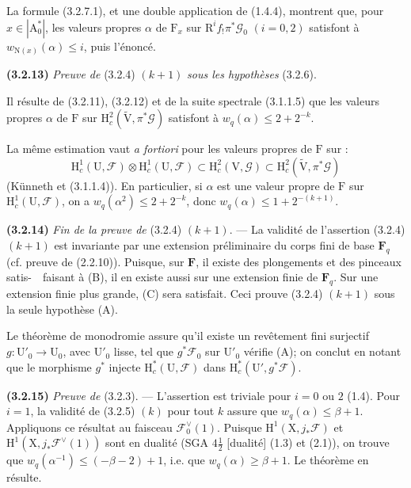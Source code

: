 \documentclass[11pt,leqno]{article}
\newcommand{\Page}[1]{\ifvmode\noindent\else\unskip\ \fi{\footnotesize\textcolor{gray}{[p.\,#1]}}\ \ignorespaces}
\begin{document}
La formule (3.2.7.1), et une double application de (1.4.4), montrent que, pour \(x\in|\mathrm{A}_0^*|\), les valeurs propres \(\alpha\) de \(\mathrm{F}_x\) sur \(\mathrm{R}^if_!\pi^*\mathscr{G}_0\) \((i=0,2)\) satisfont à \(w_{\mathrm{N}(x)}(\alpha)\leq i\), puis l’énoncé.

\textbf{(3.2.13)} \textit{Preuve de} (3.2.4) \((k+1)\) \textit{sous les hypothèses} (3.2.6).

Il résulte de (3.2.11), (3.2.12) et de la suite spectrale (3.1.1.5) que les valeurs propres \(\alpha\) de \(\mathrm{F}\) sur \(\mathrm{H}_c^2(\widetilde{\mathrm{V}},\pi^*\mathscr{G})\) satisfont à \(w_q(\alpha)\leq2+2^{-k}\).

La même estimation vaut \textit{a fortiori} pour les valeurs propres de \(\mathrm{F}\) sur :
\[
\mathrm{H}_c^1(\mathrm{U},\mathscr{F})\otimes
\mathrm{H}_c^1(\mathrm{U},\mathscr{F})
\subset\mathrm{H}_c^2(\mathrm{V},\mathscr{G})
\subset\mathrm{H}_c^2(\widetilde{\mathrm{V}},\pi^*\mathscr{G})
\]
(Künneth et (3.1.1.4)). En particulier, si \(\alpha\) est une valeur propre de \(\mathrm{F}\) sur \(\mathrm{H}_c^1(\mathrm{U},\mathscr{F})\), on a \(w_q(\alpha^2)\leq2+2^{-k}\), donc \(w_q(\alpha)\leq1+2^{-(k+1)}\).

\textbf{(3.2.14)} \textit{Fin de la preuve de} (3.2.4) \((k+1)\). — La validité de l’assertion (3.2.4) \((k+1)\) est invariante par une extension préliminaire du corps fini de base \(\mathbf{F}_q\) (cf. preuve de (2.2.10)). Puisque, sur \(\mathbf{F}\), il existe des plongements et des pinceaux satis-\Page{204}faisant à (B), il en existe aussi sur une extension finie de \(\mathbf{F}_q\). Sur une extension finie plus grande, (C) sera satisfait. Ceci prouve (3.2.4) \((k+1)\) sous la seule hypothèse (A).

Le théorème de monodromie assure qu’il existe un revêtement fini surjectif \(g:\mathrm{U}'_0\to\mathrm{U}_0\), avec \(\mathrm{U}'_0\) lisse, tel que \(g^*\mathscr{F}_0\) sur \(\mathrm{U}'_0\) vérifie (A); on conclut en notant que le morphisme \(g^*\) injecte \(\mathrm{H}_c^*(\mathrm{U},\mathscr{F})\) dans \(\mathrm{H}_c^*(\mathrm{U}',g^*\mathscr{F})\).

\textbf{(3.2.15)} \textit{Preuve de} (3.2.3). — L’assertion est triviale pour \(i=0\) ou \(2\) (1.4). Pour \(i=1\), la validité de (3.2.5) \((k)\) pour tout \(k\) assure que \(w_q(\alpha)\leq\beta+1\). Appliquons ce résultat au faisceau \(\mathscr{F}_0^\vee(1)\). Puisque \(\mathrm{H}^1(\mathrm{X},j_*\mathscr{F})\) et \(\mathrm{H}^1(\mathrm{X},j_*\mathscr{F}^\vee(1))\) sont en dualité (SGA \(4\frac{1}{2}\) [dualité] (1.3) et (2.1)), on trouve que \(w_q(\alpha^{-1})\leq(-\beta-2)+1\), i.e. que \(w_q(\alpha)\geq\beta+1\). Le théorème en résulte.
\end{document}
